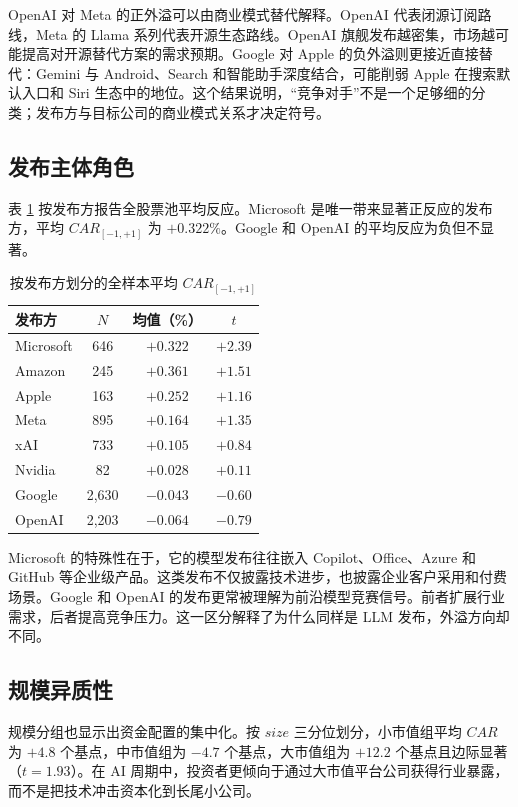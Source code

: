 \documentclass[11pt,fontset=fandol]{ctexart}
\begin{document}
OpenAI 对 Meta 的正外溢可以由商业模式替代解释。OpenAI 代表闭源订阅路线，Meta 的 Llama 系列代表开源生态路线。OpenAI 旗舰发布越密集，市场越可能提高对开源替代方案的需求预期。Google 对 Apple 的负外溢则更接近直接替代：Gemini 与 Android、Search 和智能助手深度结合，可能削弱 Apple 在搜索默认入口和 Siri 生态中的地位。这个结果说明，“竞争对手”不是一个足够细的分类；发布方与目标公司的商业模式关系才决定符号。

\subsection{发布主体角色}

表 \ref{tab:by_publisher} 按发布方报告全股票池平均反应。Microsoft 是唯一带来显著正反应的发布方，平均 $CAR_{[-1,+1]}$ 为 $+0.322\%$。Google 和 OpenAI 的平均反应为负但不显著。

\begin{table}[htbp]
\centering
\caption{按发布方划分的全样本平均 $CAR_{[-1,+1]}$}
\label{tab:by_publisher}
\small
\begin{tabular}{lccc}
\toprule
发布方 & $N$ & 均值（\%） & $t$ \\
\midrule
Microsoft & 646  & $+0.322$ & $+2.39$ \\
Amazon    & 245  & $+0.361$ & $+1.51$ \\
Apple     & 163  & $+0.252$ & $+1.16$ \\
Meta      & 895  & $+0.164$ & $+1.35$ \\
xAI       & 733  & $+0.105$ & $+0.84$ \\
Nvidia    & 82   & $+0.028$ & $+0.11$ \\
Google    & 2{,}630 & $-0.043$ & $-0.60$ \\
OpenAI    & 2{,}203 & $-0.064$ & $-0.79$ \\
\bottomrule
\end{tabular}
\end{table}

Microsoft 的特殊性在于，它的模型发布往往嵌入 Copilot、Office、Azure 和 GitHub 等企业级产品。这类发布不仅披露技术进步，也披露企业客户采用和付费场景。Google 和 OpenAI 的发布更常被理解为前沿模型竞赛信号。前者扩展行业需求，后者提高竞争压力。这一区分解释了为什么同样是 LLM 发布，外溢方向却不同。

\subsection{规模异质性}

规模分组也显示出资金配置的集中化。按 $size$ 三分位划分，小市值组平均 $CAR$ 为 $+4.8$ 个基点，中市值组为 $-4.7$ 个基点，大市值组为 $+12.2$ 个基点且边际显著（$t=1.93$）。在 AI 周期中，投资者更倾向于通过大市值平台公司获得行业暴露，而不是把技术冲击资本化到长尾小公司。
\end{document}
